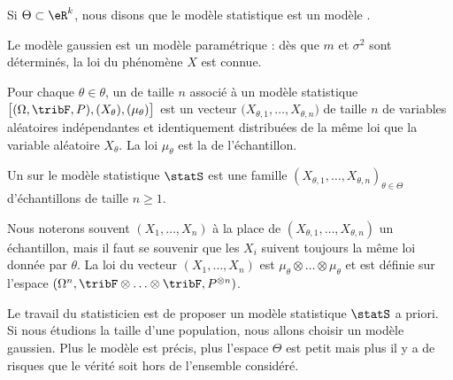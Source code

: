 \begin{definition}
    Si \( \Theta\subset\eR^k\), nous disons que le modèle statistique est un modèle .
\end{definition}
Le modèle gaussien est un modèle paramétrique : dès que \( m\) et \( \sigma^2\) sont déterminés, la loi du phénomène \( X\) est connue.

\begin{definition}
    Pour chaque \( \theta\in\theta\), un  de taille \( n\) associé à un modèle statistique \( \big[ (\Omega,\tribF,P),(X_{\theta}),(\mu_{\theta}) \big]\) est un vecteur \( \big( X_{\theta,1},\ldots,X_{\theta,n} \big)\) de taille \( n\) de variables aléatoires indépendantes et identiquement distribuées de la même loi que la variable aléatoire \( X_{\theta}\). La loi \( \mu_{\theta}\) est la  de l'échantillon.
\end{definition}

\begin{definition}
    Un  sur le modèle statistique \( \statS\) est une famille \( (X_{\theta,1},\ldots, X_{\theta,n})_{\theta\in\Theta}\) d'échantillons de taille \( n\geq 1\).
\end{definition}

Nous noterons souvent \( (X_1,\ldots,X_n)\) à la place de \( (X_{\theta,1},\ldots,X_{\theta,n})\) un échantillon, mais il faut se souvenir que les \( X_i\) suivent toujours la même loi donnée par \( \theta\). La loi du vecteur \( (X_1,\ldots,X_n)\) est \( \mu_{\theta}\otimes\ldots\otimes\mu_{\theta}\) et est définie sur l'espace \( (\Omega^n,\tribF\otimes\ldots\otimes\tribF,P^{\otimes n})\).

\begin{remark}
    Le travail du statisticien est de proposer un modèle statistique \( \statS\) a priori. Si nous étudions la taille d'une population, nous allons choisir un modèle gaussien. Plus le modèle est précis, plus l'espace \( \Theta\) est petit mais plus il y a de risques que le vérité soit hors de l'ensemble considéré.
\end{remark}

